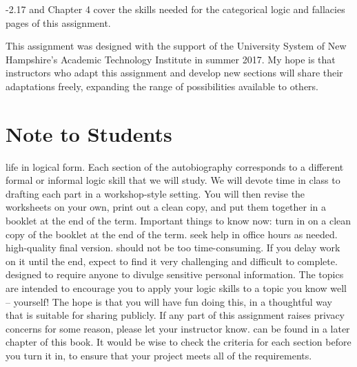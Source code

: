 \documentclass[oneside, openany]{book} %
\begin{document}
-2.17 and Chapter 4 cover the skills needed for the categorical logic and fallacies pages of this assignment.
 
This assignment was designed with the support of the University System of New Hampshire's Academic Technology Institute in summer 2017.  My hope is that instructors who adapt this 
assignment and develop new sections will share their adaptations freely, expanding the range of possibilities available to others.


\chapter{Note to Students}

life in logical form. Each section of the autobiography corresponds to a different formal or informal logic skill that we will study. We will devote time in class to drafting each part in 
a workshop-style setting. You will then revise the worksheets on your own, print out a clean copy, and put them together in a booklet at the end of the term. %
Important things to know now: %
turn in on a clean copy of the booklet at the end of the term. %
seek help in office hours as needed. %
high-quality final version. %
should not be too time-consuming. If you delay work on it until the end, expect to find it very challenging and difficult to complete. %
designed to require anyone to divulge sensitive personal information. The topics are intended to encourage you to apply your logic skills to a topic you know well -- yourself! The hope is 
that you will have fun doing this, in a thoughtful way that is suitable for sharing publicly. If any part of this assignment raises privacy concerns for some reason, please let your 
instructor know. %
can be found in a later chapter of this book. It would be wise to check the criteria for each section before you turn it in, to ensure that your project meets all of the requirements.
\end{document}
